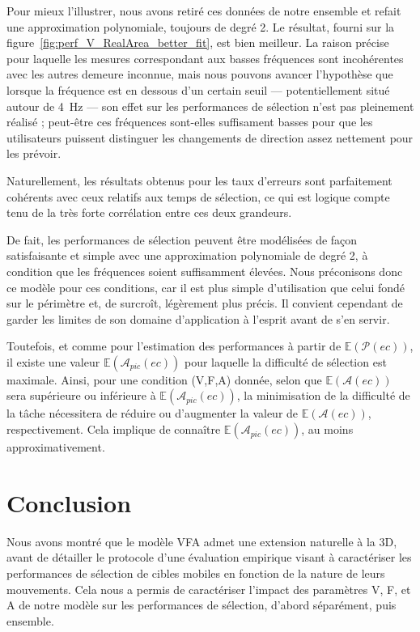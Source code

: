 	Pour mieux l'illustrer, nous avons retiré ces données de notre ensemble et refait une approximation polynomiale, toujours de degré 2. Le résultat, fourni sur la figure~\ref{fig:perf_V_RealArea_better_fit}, est bien meilleur. La raison précise pour laquelle les mesures correspondant aux basses fréquences sont incohérentes avec les autres demeure inconnue, mais nous pouvons avancer l'hypothèse que lorsque la fréquence est en dessous d'un certain seuil --- potentiellement situé autour de 4~Hz --- son effet sur les performances de sélection n'est pas pleinement réalisé ; peut-être ces fréquences sont-elles suffisament basses pour que les utilisateurs puissent distinguer les changements de direction assez nettement pour les prévoir.
	
	Naturellement, les résultats obtenus pour les taux d'erreurs sont parfaitement cohérents avec ceux relatifs aux temps de sélection, ce qui est logique compte tenu de la très forte corrélation entre ces deux grandeurs.
	
	De fait, les performances de sélection peuvent être modélisées de façon satisfaisante et simple avec une approximation polynomiale de degré 2, à condition que les fréquences soient suffisamment élevées. Nous préconisons donc ce modèle pour ces conditions, car il est plus simple d'utilisation que celui fondé sur le périmètre et, de surcroît, légèrement plus précis. Il convient cependant de garder les limites de son domaine d'application à l'esprit avant de s'en servir.
	
	Toutefois, et comme pour l'estimation des performances à partir de $\mathbb{E}(\mathcal{P}(ec))$, il existe une valeur $\mathbb{E}(\mathcal{A}_{pic}(ec))$ pour laquelle la difficulté de sélection est maximale. Ainsi, pour une condition (V,F,A) donnée, selon que $\mathbb{E}(\mathcal{A}(ec))$ sera supérieure ou inférieure à $\mathbb{E}(\mathcal{A}_{pic}(ec))$, la minimisation de la difficulté de la tâche nécessitera de réduire ou d'augmenter la valeur de $\mathbb{E}(\mathcal{A}(ec))$, respectivement. Cela implique de connaître $\mathbb{E}(\mathcal{A}_{pic}(ec))$, au moins approximativement.

\section{Conclusion}
	Nous avons montré que le modèle VFA admet une extension naturelle à la 3D, avant de détailler le protocole d'une évaluation empirique visant à caractériser les performances de sélection de cibles mobiles en fonction de la nature de leurs mouvements. Cela nous a permis de caractériser l'impact des paramètres V, F, et A de notre modèle sur les performances de sélection, d'abord séparément, puis ensemble.
	

